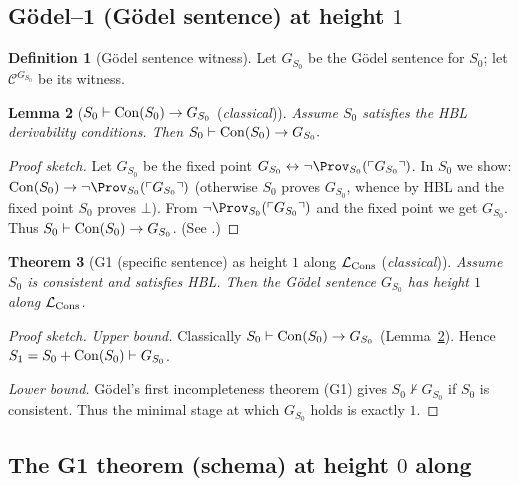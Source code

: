 \documentclass[11pt]{article}
\newtheorem{theorem}{Theorem}[section]
\newtheorem{lemma}[theorem]{Lemma}
\theoremstyle{definition}
\newtheorem{definition}[theorem]{Definition}
\theoremstyle{remark}
\begin{document}
\subsection{G\"odel--1 (G\"odel sentence) at height \(1\)}

\begin{definition}[G\"odel sentence witness]
Let \(G_{S_0}\) be the G\"odel sentence for \(S_0\); let \(\mathcal C^{G_{S_0}}\) be its witness.
\end{definition}

\begin{lemma}[\(S_0\vdash \mathrm{Con}(S_0)\to G_{S_0}\) (\emph{classical})]\label{III:lem:Con-implies-G-new}
Assume \(S_0\) satisfies the HBL derivability conditions. Then
\(S_0 \vdash \mathrm{Con}(S_0) \to G_{S_0}.\)
\end{lemma}

\begin{proof}[Proof sketch]
Let \(G_{S_0}\) be the fixed point \(G_{S_0} \leftrightarrow \neg \Prov_{S_0}(\ulcorner G_{S_0}\urcorner)\).
In \(S_0\) we show: \(\Con(S_0)\to \neg \Prov_{S_0}(\ulcorner G_{S_0}\urcorner)\) (otherwise \(S_0\) proves \(G_{S_0}\),
whence by HBL and the fixed point \(S_0\) proves \(\bot\)). From \(\neg \Prov_{S_0}(\ulcorner G_{S_0}\urcorner)\)
and the fixed point we get \(G_{S_0}\). Thus \(S_0\vdash \mathrm{Con}(S_0)\to G_{S_0}\).
(See \cite[§I.2]{HajekPudlak}.)
\end{proof}

\begin{theorem}[G1 (specific sentence) as height \(1\) along \(\mathcal{L}_{\mathrm{Cons}}\) (\emph{classical})]\label{III:thm:G1-height1-new}
Assume \(S_0\) is consistent and satisfies HBL. Then the G\"odel sentence \(G_{S_0}\)
has height \(1\) along \(\mathcal{L}_{\mathrm{Cons}}\).
\end{theorem}

\begin{proof}[Proof sketch]
\emph{Upper bound.} Classically \(S_0\vdash \mathrm{Con}(S_0)\to G_{S_0}\) (Lemma~\ref{III:lem:Con-implies-G-new}). Hence \(S_1=S_0+\mathrm{Con}(S_0)\vdash G_{S_0}\).

\emph{Lower bound.} G\"odel's first incompleteness theorem (G1) gives \(S_0\nvdash G_{S_0}\) if \(S_0\) is consistent.
Thus the minimal stage at which \(G_{S_0}\) holds is exactly \(1\).
\end{proof}

\subsection{The G1 theorem (schema) at height \(0\) along \texorpdfstring{\LArith}{LArith}}
\end{document}
